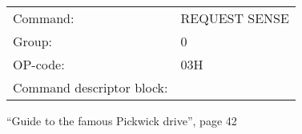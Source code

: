 %
%  
\begin{figure}[h]
  \sf
  \begin{tabular}{ll}
    Command:                  & REQUEST SENSE \\
    Group:                    & 0             \\    
    OP-code:                  & 03H           \\
    Command descriptor block: &               \\
  \end{tabular}
  {
    \footnotesize \sf
    
  }
  \caption{``Guide to the famous Pickwick drive'', page 42}
  \label{pic:pwguide2}
\end{figure}
